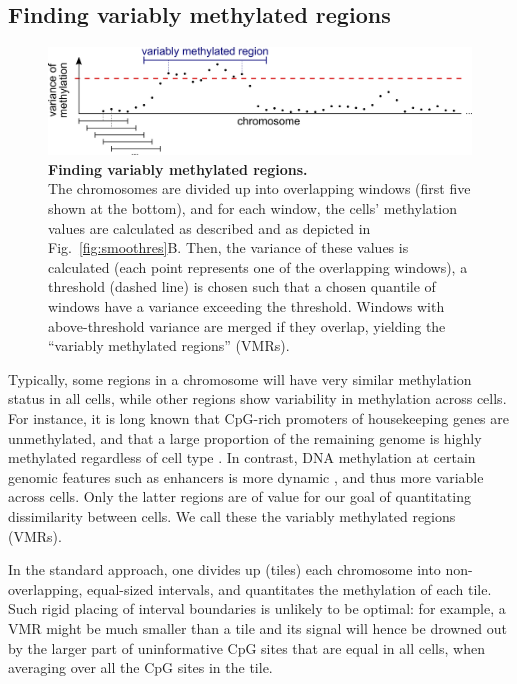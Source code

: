 \documentclass[twocolumn,10pt]{article}
\begin{document}
\subsection{Finding variably methylated regions}

\begin{figure}
    \begin{center}
    \includegraphics[width=\columnwidth]{figures/Fig_sliding.png}
    \end{center}
    \caption{\small \textbf{Finding variably methylated regions.}\\
    The chromosomes are divided up into overlapping windows (first five shown at the bottom), and for each window, the cells' methylation values are calculated as described and as depicted in Fig.~\ref{fig:smoothres}B.
    Then, the variance of these values is calculated (each point represents one of the overlapping windows), a threshold (dashed line) is chosen such that a chosen quantile of windows have a variance exceeding the threshold.
    Windows with above-threshold variance are merged if they overlap, yielding the ``variably methylated regions'' (VMRs).}
    \label{fig:vmr}
\end{figure}


Typically, some regions in a chromosome will have very similar methylation status in all cells, while other regions show variability in methylation across cells.
For instance, it is long known that CpG-rich promoters of housekeeping genes are unmethylated, and that a large proportion of the remaining genome is highly methylated regardless of cell type \citep{bird1986cpg}.
In contrast, DNA methylation at certain genomic features such as enhancers is more dynamic \citep{argelaguet2019gastru}, and thus more variable across cells.
Only the latter regions are of value for our goal of quantitating dissimilarity between cells.
We call these the variably methylated regions (VMRs). %

In the standard approach, one divides up (tiles) each chromosome into non-overlapping, equal-sized intervals, and quantitates the methylation of each tile.
Such rigid placing of interval boundaries is unlikely to be optimal: for example, a VMR might be much smaller than a tile and its signal will hence be drowned out by the larger part of uninformative CpG sites that are equal in all cells, when averaging over all the CpG sites in the tile.
\end{document}
